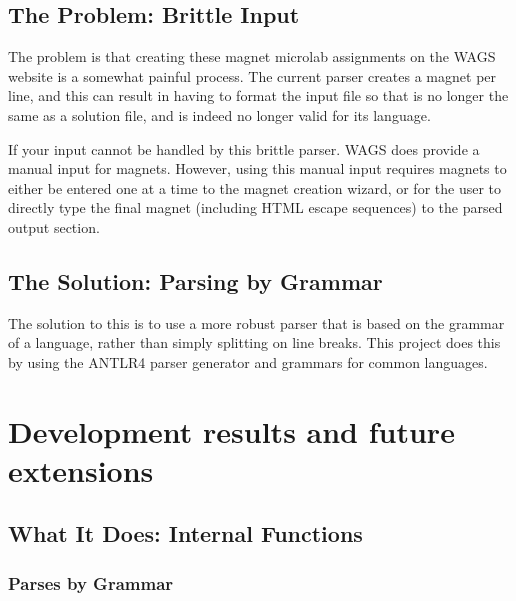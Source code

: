 \documentclass[letter,10pt]{article}
\begin{document}
\subsection{The Problem: Brittle Input}

The problem is that creating these magnet microlab assignments on the 
WAGS website is a somewhat painful process. The current parser creates 
a magnet per line, and this can result in having to format the input 
file so that is no longer the same as a solution file, and is indeed no 
longer valid for its language.


If your input cannot be handled by this brittle parser. WAGS does 
provide a manual input for magnets. However, using this manual input 
requires magnets to either be entered one at a time to the magnet 
creation wizard, or for the user to directly type the final magnet 
(including HTML escape sequences) to the parsed output section. 


\subsection{The Solution: Parsing by Grammar}

The solution to this is to use a more robust parser that is based on 
the grammar of a language, rather than simply splitting on line breaks. 
This project does this by using the ANTLR4 parser 
generator\cite{antlr-reference} and grammars for common 
languages\cite{antlr-grammars-project}.



\section{Development results and future extensions}

\subsection{What It Does: Internal Functions}

\subsubsection{Parses by Grammar}
\end{document}
